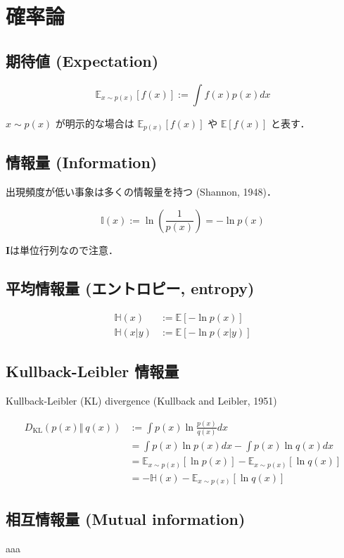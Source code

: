 \section{確率論}
\subsection{期待値 (Expectation)}


\begin{equation}
\mathbb{E}_{x\sim p(x)}\left[f(x)\right]:=\int f(x)p(x)dx
\end{equation}


$x\sim p(x)$ が明示的な場合は $\mathbb{E}_{p(x)}\left[f(x)\right]$ や $\mathbb{E}\left[f(x)\right]$ と表す．

\subsection{情報量 (Information)}
出現頻度が低い事象は多くの情報量を持つ (Shannon, 1948)．


\begin{equation}
\mathbb{I}(x):=\ln\left(\frac{1}{p(x)}\right)=-\ln p(x)
\end{equation}


$\mathbf{I}$は単位行列なので注意．

\subsection{平均情報量 (エントロピー, entropy)}


\begin{align}
\mathbb{H}(x)&:=\mathbb{E}[-\ln p(x)]\\
\mathbb{H}(x\vert y)&:=\mathbb{E}[-\ln p(x\vert y)]
\end{align}


\subsection{Kullback-Leibler 情報量}
Kullback-Leibler (KL) divergence (Kullback and Leibler, 1951)


\begin{align}
D_{\text{KL}}\left(p(x) \Vert\ q(x)\right)&:=\int p(x) \ln \frac{p(x)}{q(x)} dx\\
&=\int p(x) \ln p(x) dx-\int p(x) \ln q(x) dx\\
&=\mathbb{E}_{x\sim p(x)}[\ln p(x)]-\mathbb{E}_{x\sim p(x)}[\ln q(x)]\\
&=-\mathbb{H}(x)-\mathbb{E}_{x\sim p(x)}[\ln q(x)]
\end{align}


\subsection{相互情報量 (Mutual information)}
aaa
